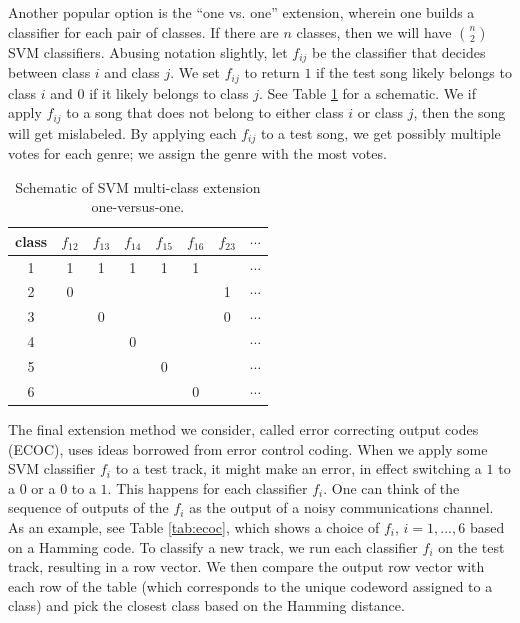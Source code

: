 \documentclass[12pt]{article}
\begin{document}
Another popular option is the ``one vs. one'' extension, wherein one builds a classifier for each pair of classes.  If there are $n$ classes, then we will have $\binom n 2$ SVM classifiers.  Abusing notation slightly, let $f_{ij}$ be the classifier that decides between class $i$ and class $j$.  We set $f_{ij}$ to return $1$ if the test song likely belongs to class $i$ and $0$ if it likely belongs to class $j$.  See Table \ref{tab:onevone} for a schematic.  We if apply $f_{ij}$ to a song that does not belong to either class $i$ or class $j$, then the song will get mislabeled.  By applying each $f_{ij}$ to a test song, we get possibly multiple votes for each genre; we assign the genre with the most votes.\\

\begin{table}
   \centering
   \begin{tabular}{|c|ccccccc|}
      \hline
      class&$f_{12}$ & $f_{13}$ & $f_{14}$ & $f_{15}$ & $f_{16}$ & $f_{23}$ & $\cdots$ \\\hline
      1 & 1 & 1 & 1 & 1 & 1 &   & $\cdots$ \\\hline
      2 & 0 &   &   &   &   & 1 & $\cdots$ \\\hline
      3 &   & 0 &   &   &   & 0 & $\cdots$ \\\hline
      4 &   &   & 0 &   &   &   & $\cdots$ \\\hline
      5 &   &   &   & 0 &   &   & $\cdots$ \\\hline
      6 &   &   &   &   & 0 &   & $\cdots$ \\\hline
   \end{tabular}
   \caption{Schematic of SVM multi-class extension one-versus-one.}
   \label{tab:onevone}
\end{table}

The final extension method we consider, called error correcting output codes (ECOC), uses ideas borrowed from error control coding.  When we apply some SVM classifier $f_i$ to a test track, it might make an error, in effect switching a $1$ to a $0$ or a $0$ to a $1$.  This happens for each classifier $f_i$.  One can think of the sequence of outputs of the $f_i$ as the output of a noisy communications channel.  As an example, see Table \ref{tab:ecoc}, which shows a choice of $f_i$, $i=1,...,6$ based on a Hamming code.  To classify a new track, we run each classifier $f_i$ on the test track, resulting in a row vector.  We then compare the output row vector with each row of the table (which corresponds to the unique codeword assigned to a class) and pick the closest class based on the Hamming distance.\\
\end{document}
